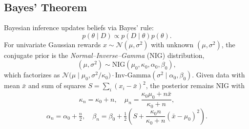 \documentclass[sigconf,anonymous]{aamas}
\begin{document}
\subsection{Bayes' Theorem}




Bayesian inference updates beliefs via Bayes' rule:
\[
p(\theta\mid D)\propto p(D\mid\theta)p(\theta).
\]
For univariate Gaussian rewards $x\sim\mathcal{N}(\mu,\sigma^2)$ with unknown $(\mu,\sigma^2)$, the conjugate prior is the \emph{Normal--Inverse--Gamma} (NIG) distribution,
\[
(\mu,\sigma^2)\sim\mathrm{NIG}(\mu_0,\kappa_0,\alpha_0,\beta_0),
\]
which factorizes as $\mathcal{N}\!\bigl(\mu \mid \mu_0, \sigma^2/\kappa_0\bigr) \cdot \mathrm{Inv\text{-}Gamma}(\sigma^2 \mid \alpha_0, \beta_0)$.
Given data with mean $\bar{x}$ and sum of squares $S=\sum_{i}(x_i-\bar{x})^2$, the posterior remains NIG with
\[
\kappa_n=\kappa_0+n,\quad
\mu_n=\frac{\kappa_0\mu_0+n\bar{x}}{\kappa_0+n},
\]
\[
\alpha_n=\alpha_0+\tfrac{n}{2},\quad
\beta_n=\beta_0+\tfrac12\!\left(S+\frac{\kappa_0 n}{\kappa_0+n}(\bar{x}-\mu_0)^2\right).
\]


\end{document}
